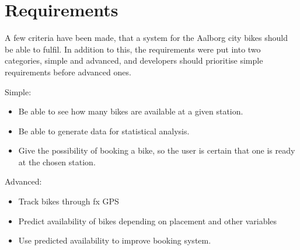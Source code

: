 \section{Requirements}
A few criteria have been made, that a system for the Aalborg city bikes should be able to fulfil. In addition to this, the requirements were put into two categories, simple and advanced, and developers should prioritise simple requirements before advanced ones.

Simple:
\begin{itemize}
\item Be able to see how many bikes are available at a given station.
\item Be able to generate data for statistical analysis.
\item Give the possibility of booking a bike, so the user is certain that one is ready at the chosen station.
\end{itemize}

Advanced:
\begin{itemize}
\item Track bikes through fx GPS
\item Predict availability of bikes depending on placement and other variables
\item Use predicted availability to improve booking system.
\end{itemize}